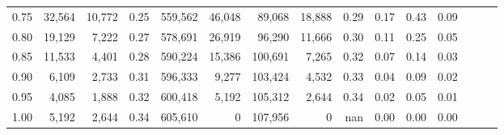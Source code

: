 \begin{tabular}{rrrrrrrrrrrrrrr}
0.75 &  32,564 &  10,772 &  0.25 &  559,562 &   46,048 &   89,068 &   18,888 &  0.29 &  0.17 &  0.43 &      0.09 \\
0.80 &  19,129 &   7,222 &  0.27 &  578,691 &   26,919 &   96,290 &   11,666 &  0.30 &  0.11 &  0.25 &      0.05 \\
0.85 &  11,533 &   4,401 &  0.28 &  590,224 &   15,386 &  100,691 &    7,265 &  0.32 &  0.07 &  0.14 &      0.03 \\
0.90 &   6,109 &   2,733 &  0.31 &  596,333 &    9,277 &  103,424 &    4,532 &  0.33 &  0.04 &  0.09 &      0.02 \\
0.95 &   4,085 &   1,888 &  0.32 &  600,418 &    5,192 &  105,312 &    2,644 &  0.34 &  0.02 &  0.05 &      0.01 \\
1.00 &   5,192 &   2,644 &  0.34 &  605,610 &        0 &  107,956 &        0 &   nan &  0.00 &  0.00 &      0.00 \\
\bottomrule
\end{tabular}

